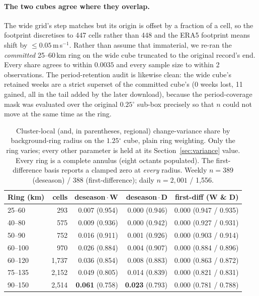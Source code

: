 \documentclass[11pt,a4paper]{article}
\providecommand{\degree}{\ensuremath{^{\circ}}}
\begin{document}
\paragraph{The two cubes agree where they overlap.} The wide grid's step matches but its origin is
offset by a fraction of a cell, so the footprint discretises to 447 cells rather than 448 and the
ERA5 footprint means shift by ${\le}0.05$\,m\,s$^{-1}$. Rather than assume that immaterial, we
re-ran the \emph{committed} 25--60\,km ring on the wide cube truncated to the original record's end.
Every share agrees to within $0.0035$ and every sample size to within 2 observations. The
period-retention audit is likewise clean: the wide cube's retained weeks are a strict superset of
the committed cube's ($0$ weeks lost, 11 gained, all in the tail added by the later download),
because the period-coverage mask was evaluated over the original $0.25\degree$ sub-box precisely so
that $n$ could not move at the same time as the ring.

\begin{table}[t]
\centering
\caption{Cluster-local (and, in parentheses, regional) change-variance share by background-ring
radius on the $1.25\degree$ cube, plain ring weighting. Only the ring varies; every other parameter
is held at its Section~\ref{sec:variance} value. Every ring is a complete annulus (eight octants
populated). The first-difference basis reports a clamped zero at \emph{every} radius. Weekly
$n=389$ (deseason) / 388 (first-difference); daily $n=2{,}001$ / 1{,}556.}
\label{tab:ringsweep}
\small
\begin{tabular}{@{}lrrrr@{}}
\toprule
Ring (km) & cells & deseason\,$\cdot$\,W & deseason\,$\cdot$\,D & first-diff (W \& D) \\
\midrule
25--60  &  293 & 0.007 \; (0.954) & 0.000 \; (0.946) & 0.000 \; (0.947 / 0.935) \\
40--80  &  575 & 0.009 \; (0.936) & 0.000 \; (0.942) & 0.000 \; (0.927 / 0.931) \\
50--90  &  752 & 0.016 \; (0.911) & 0.001 \; (0.926) & 0.000 \; (0.903 / 0.914) \\
60--100 &  970 & 0.026 \; (0.884) & 0.004 \; (0.907) & 0.000 \; (0.884 / 0.896) \\
60--120 & 1{,}737 & 0.036 \; (0.854) & 0.008 \; (0.883) & 0.000 \; (0.863 / 0.872) \\
75--135 & 2{,}152 & 0.049 \; (0.805) & 0.014 \; (0.839) & 0.000 \; (0.821 / 0.831) \\
90--150 & 2{,}514 & \textbf{0.061} \; (0.758) & \textbf{0.023} \; (0.793) & 0.000 \; (0.781 / 0.788) \\
\bottomrule
\end{tabular}
\end{table}
\end{document}
